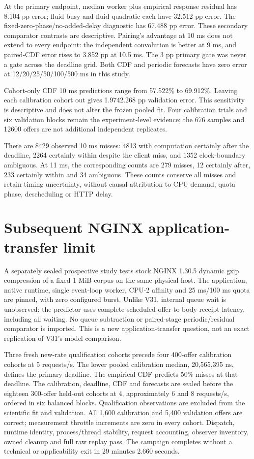 \documentclass[11pt,a4paper]{article}
\begin{document}
At the primary endpoint, median worker plus empirical response residual has
8.104 pp error; fluid busy and fluid quadratic each have 32.512 pp error.
The fixed-zero-phase/no-added-delay diagnostic has 67.488 pp error. These
secondary comparator contrasts are descriptive. Pairing's advantage at 10 ms
does not extend to every endpoint: the independent convolution is better at
9 ms, and paired-CDF error rises to 3.852 pp at 10.5 ms. The 3 pp primary gate
was never a gate across the deadline grid. Both CDF and periodic forecasts
have zero error at 12/20/25/50/100/500 ms in this study.

Cohort-only CDF 10 ms predictions range from 57.522\% to 69.912\%. Leaving each
calibration cohort out gives 1.974\textendash{}2.268 pp validation error. This sensitivity
is descriptive and does not alter the frozen pooled fit. Four calibration
trials and six validation blocks remain the experiment-level evidence; the
676 samples and 12600 offers are not additional independent replicates.

There are 8429 observed 10 ms misses: 4813 with computation certainly after
the deadline, 2264 certainly within despite the client miss, and 1352
clock-boundary ambiguous. At 11 ms, the corresponding counts are 279 misses,
12 certainly after, 233 certainly within and 34 ambiguous. These counts
conserve all misses and retain timing uncertainty, without causal attribution
to CPU demand, quota phase, descheduling or HTTP delay.

\section{Subsequent NGINX application-transfer limit}

A separately sealed prospective study tests stock NGINX 1.30.5 dynamic gzip
compression of a fixed 1 MiB corpus on the same physical host. The application,
native runtime, single event-loop worker, CPU-2 affinity and 25 ms/100 ms quota
are pinned, with zero configured burst. Unlike V31, internal queue wait is
unobserved: the predictor uses complete scheduled-offer-to-body-receipt latency,
including all waiting. No queue subtraction or paired-stage periodic/residual
comparator is imported. This is a new application-transfer question, not an
exact replication of V31's model comparison.

Three fresh new-rate qualification cohorts precede four 400-offer calibration
cohorts at 5 requests/s. The lower pooled calibration median, 20,565,395 ns,
defines the primary deadline. The empirical CDF predicts 50\% misses at that
deadline. The calibration, deadline, CDF and forecasts are sealed before the
eighteen 300-offer held-out cohorts at 4, approximately 6 and 8 requests/s,
ordered in six balanced blocks. Qualification observations are excluded from
the scientific fit and validation. All 1,600 calibration and 5,400 validation
offers are correct; measurement throttle increments are zero in every cohort.
Dispatch, runtime identity, process/thread stability, request accounting,
observer inventory, owned cleanup and full raw replay pass. The campaign
completes without a technical or applicability exit in 29 minutes 2.660 seconds.
\end{document}
